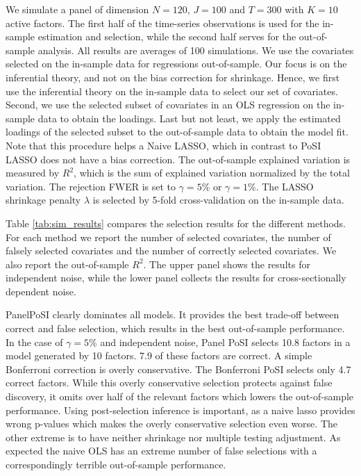 \documentclass[11pt]{article}
\begin{document}
	We simulate a panel of dimension $N=120$, $J=100$ and $T=300$ with $K=10$ active factors. The first half of the time-series observations is used for the in-sample estimation and selection, while the second half serves for the out-of-sample analysis. All results are averages of 100 simulations. We use the covariates selected on the in-sample data for regressions out-of-sample. Our focus is on the inferential theory, and not on the bias correction for shrinkage. Hence, we first use the inferential theory on the in-sample data to select our set of covariates. Second, we use the selected subset of covariates in an OLS regression on the in-sample data to obtain the loadings. Last but not least, we apply the estimated loadings of the selected subset to the out-of-sample data to obtain the model fit. Note that this procedure helps a Naive LASSO, which in contrast to PoSI LASSO does not have a bias correction. The out-of-sample explained variation is measured by $R^2$, which is the sum of explained variation normalized by the total variation. The rejection FWER is set to $\gamma=5\%$ or $\gamma=1\%$. The LASSO shrinkage penalty $\lambda$ is selected by 5-fold cross-validation on the in-sample data. 
	
	
	
	
	Table \ref{tab:sim_results} compares the selection results for the different methods. For each method we report the number of selected covariates, the number of falsely selected covariates and the number of correctly selected covariates. We also report the out-of-sample $R^2$. The upper panel shows the results for independent noise, while the lower panel collects the results for cross-sectionally dependent noise.
	
	PanelPoSI clearly dominates all models. It provides the best trade-off between correct and false selection, which results in the best out-of-sample performance. In the case of $\gamma=5\%$ and independent noise, Panel PoSI selects 10.8 factors in a model generated by 10 factors. 7.9 of these factors are correct. A simple Bonferroni correction is overly conservative. The Bonferroni PoSI selects only 4.7 correct factors. While this overly conservative selection protects against false discovery, it omits over half of the relevant factors which lowers the out-of-sample performance. Using post-selection inference is important, as a naive lasso provides wrong p-values which makes the overly conservative selection even worse. The other extreme is to have neither shrinkage nor multiple testing adjustment. As expected the naive OLS has an extreme number of false selections with a correspondingly terrible out-of-sample performance. 
	
\end{document}
